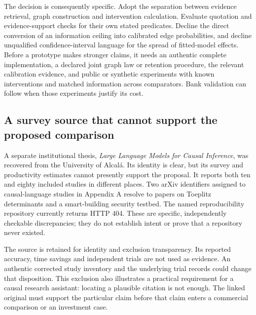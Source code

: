 The decision is consequently specific. Adopt the separation between
evidence retrieval, graph construction and intervention calculation.
Evaluate quotation and evidence-support checks for their own stated
predicates. Decline the direct conversion of an information ceiling into
calibrated edge probabilities, and decline unqualified confidence-interval
language for the spread of fitted-model effects. Before a prototype makes
stronger claims, it needs an authentic complete implementation, a declared
joint graph law or retention procedure, the relevant calibration evidence,
and public or synthetic experiments with known interventions and matched
information across comparators. Bank validation can follow when those
experiments justify its cost.

\subsection{A survey source that cannot support the proposed comparison}

A separate institutional thesis, \emph{Large Language Models for Causal
Inference}, was recovered from the University of Alcal\'a. Its identity is
clear, but its survey and productivity estimates cannot presently support
the proposal. It reports both ten and eighty included studies in different
places. Two arXiv identifiers assigned to causal-language studies in
Appendix A resolve to papers on Toeplitz determinants and a smart-building
security testbed. The named reproducibility repository currently returns
HTTP 404. These are specific, independently checkable discrepancies;
they do not establish intent or prove that a repository never existed.
\citep[Section 4.1, Tables 5--6 and 9, Section 5.4.3, Appendix A]
{closure30aitlhouss}

The source is retained for identity and exclusion transparency. Its reported
accuracy, time savings and independent trials are not used as evidence.
An authentic corrected study inventory and the underlying trial records
could change that disposition. This exclusion also illustrates a practical
requirement for a causal research assistant: locating a plausible citation
is not enough. The linked original must support the particular claim before
that claim enters a commercial comparison or an investment case.
